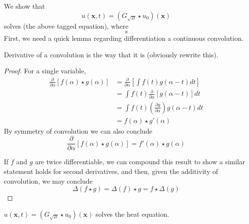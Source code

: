     We show that
    \begin{equation}
    u(\bm{x},t) = \left(G_{\sqrt{2t}} \star u_0 \right)(\bm{x})
    \end{equation}
    solves (the above tagged equation), where
    \[
    s
    \]
    First, we need a quick lemma regarding differentiation a continuous convolution.
    \begin{lemma} \label{dconvolution}
    	Derivative of a convolution is the way that it is (obviously rewrite this).
    \end{lemma}
    \begin{proof}
    	For a single variable,
    	\begin{align}
    	\frac{\partial}{\partial \alpha} \left[ f(\alpha) \star g(\alpha) \right]
    	&= \frac{\partial}{\partial \alpha} \left[ 
    	\int f(t) g(\alpha - t) dt \right] \\
    	&=  \int f(t) \frac{\partial}{\partial \alpha}\left[ g(\alpha - t)  \right] dt \\
    	&=  \int f(t) \left(\frac{\partial g}{\partial \alpha}\right) g(\alpha - t) dt \\
    	&=  f(\alpha) \star g'(\alpha)
    	\end{align}
    	By symmetry of convolution we can also conclude 
    	\[\frac{\partial}{\partial \alpha} \left[ f(\alpha) \star g(\alpha) \right]
    	= f'(\alpha) \star g(\alpha)
    	\]
    	
    	If $f$ and $g$ are twice differentiable, we can compound this result to show a similar statement holds for second derivatives, and then, given the additivity of convolution,
    	we may conclude
    	\begin{equation}
    	\Delta \left(f \star g \right) = \Delta(f) \star g = f \star \Delta(g) 
    	\end{equation} 
    \end{proof}
    \begin{theorem}
    	$u(\bm{x},t) = \left(G_{\sqrt{2t}} \star u_0 \right)(\bm{x})$ solves the heat equation.
    \end{theorem}
